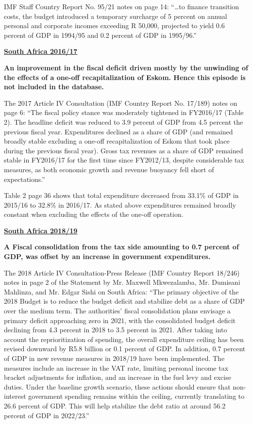 IMF Staff Country Report No. 95/21 notes on page 14: “…to finance transition costs, the budget introduced a temporary surcharge of 5 percent on annual personal and corporate incomes exceeding R 50,000, projected to yield 0.6 percent of GDP in 1994/95 and 0.2 percent of GDP in 1995/96.”

\textbf{\underline{South Africa 2016/17}}

\textbf{An improvement in the fiscal deficit driven mostly by the unwinding of the effects of a one-off recapitalization of Eskom. Hence this episode is not included in the database.}

The 2017 Article IV Consultation (IMF Country Report No. 17/189) notes on page 6: “The fiscal policy stance was moderately tightened in FY2016/17 (Table 2). The headline deficit was reduced to 3.9 percent of GDP from 4.5 percent the previous fiscal year. Expenditures declined as a share of GDP (and remained broadly stable excluding a one-off recapitalization of Eskom that took place during the previous fiscal year). Gross tax revenues as a share of GDP remained stable in FY2016/17 for the first time since FY2012/13, despite considerable tax measures, as both economic growth and revenue buoyancy fell short of expectations.”

Table 2 page 36 shows that total expenditure decreased from 33.1\% of GDP in 2015/16 to 32.8\% in 2016/17. As stated above expenditures remained broadly constant when excluding the effects of the one-off operation.

\textbf{\underline{South Africa 2018/19}}

\textbf{A Fiscal consolidation from the tax side amounting to 0.7 percent of GDP, was offset by an increase in government expenditures.}

The 2018 Article IV Consultation-Press Release (IMF Country Report 18/246) notes in page 2 of the Statement by Mr. Maxwell Mkwezalamba, Mr. Dumisani Mahlinza, and Mr. Edgar Sishi on South Africa: “The primary objective of the 2018 Budget is to reduce the budget deficit and stabilize debt as a share of GDP over the medium term. The authorities’ fiscal consolidation plans envisage a primary deficit approaching zero in 2021, with the consolidated budget deficit declining from 4.3 percent in 2018 to 3.5 percent in 2021. After taking into account the reprioritization of spending, the overall expenditure ceiling has been revised downward by R5.8 billion or 0.1 percent of GDP. In addition, 0.7 percent of GDP in new revenue measures in 2018/19 have been implemented. The measures include an increase in the VAT rate, limiting personal income tax bracket adjustments for inflation, and an increase in the fuel levy and excise duties. Under the baseline growth scenario, these actions should ensure that non-interest government spending remains within the ceiling, currently translating to 26.6 percent of GDP. This will help stabilize the debt ratio at around 56.2 percent of GDP in 2022/23.”


